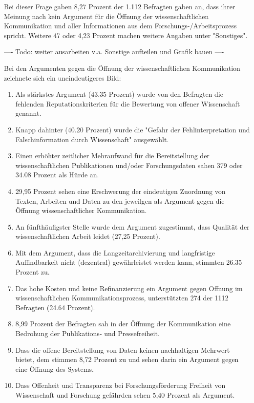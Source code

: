 Bei dieser Frage gaben 8,27 Prozent der 1.112 Befragten gaben an, dass ihrer Meinung nach kein Argument für die Öffnung der wissenschaftlichen Kommunikation und aller Informationen aus dem Forschungs-/Arbeitsprozess spricht. Weitere 47 oder 4,23 Prozent machen weitere Angaben unter "Sonstiges".

---- Todo: weiter ausarbeiten v.a. Sonstige aufteilen und Grafik bauen ----

Bei den Argumenten gegen die Öffnung der wissenschaftlichen Kommunikation zeichnete sich ein uneindeutigeres Bild:
\begin{enumerate}
\item Als stärkstes Argument (43.35 Prozent) wurde von den Befragten die fehlenden Reputationskriterien für die Bewertung von offener Wissenschaft genannt.
\item Knapp dahinter (40.20 Prozent) wurde die "Gefahr der Fehlinterpretation und Falschinformation durch Wissenschaft" ausgewählt.
\item Einen erhöhter zeitlicher Mehraufwand für die Bereitstellung der wissenschaftlichen Publikationen und/oder Forschungsdaten sahen 379 oder 34.08 Prozent als Hürde an.
\item 29,95 Prozent sehen eine Erschwerung der eindeutigen Zuordnung von Texten, Arbeiten und Daten zu den jeweilgen als Argument gegen die Öffnung wissenschaftlicher Kommunikation.
\item  An fünfthäufigster Stelle wurde dem Argument zugestimmt, dass Qualität der wissenschaftlichen Arbeit leidet (27,25 Prozent).
\item Mit dem Argument, dass die Langzeitarchivierung und langfristige Auffindbarkeit nicht (dezentral) gewährleistet werden kann, stimmten 26.35 Prozent zu.
\item Das hohe Kosten und keine Refinanzierung ein Argument gegen Offnung im wissenschaftlichen Kommunikationsprozess, unterstützten 274 der 1112 Befragten (24.64 Prozent).
\item 8,99 Prozent der Befragten sah in der Öffnung der Kommunikation eine Bedrohung der Publikations- und Pressefreiheit.
\item Dass die offene Bereitstellung von Daten keinen nachhaltigen Mehrwert bietet, dem stimmen 8,72 Prozent zu und sehen darin ein Argument gegen eine Öffnung des Systems.
\item Dass Offenheit und Transparenz bei Forschungsförderung Freiheit von Wissenschaft und Forschung gefährden sehen 5,40 Prozent als Argument.
\end{enumerate}

